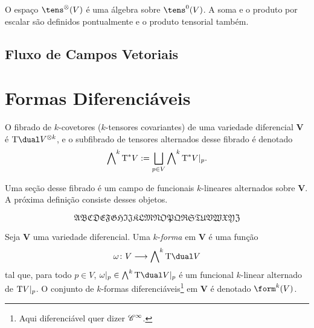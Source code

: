 O espaço $\tens^\otimes (V)$ é uma álgebra sobre $\tens^0(V)$. A soma e o produto por escalar são definidos pontualmente e o produto tensorial também.



   







\subsection{Fluxo de Campos Vetoriais}















\section{Formas Diferenciáveis}

O fibrado de $k$-covetores ($k$-tensores covariantes) de uma variedade diferencial $\bm V$ é $\Tg\dual V^{\otimes k}$, e o subfibrado de tensores alternados desse fibrado é denotado
	\begin{equation*}
	\bigwedge\nolimits^k \mathrm{T}^* V := \bigsqcup_{p \in V} \bigwedge\nolimits^k \mathrm{T}^* V|_p.
	\end{equation*}

Uma seção desse fibrado é um campo de funcionais $k$-lineares alternados sobre $\bm V$. A próxima definição consiste desses objetos.

	\begin{equation*}
	\mathfrak{ABCDEFGHIJKLMNOPQRSTUVWXYZ}
	\end{equation*}

\begin{defi}
Seja $\bm V$ uma variedade diferencial. Uma $k$-\emph{forma} em $\bm V$ é uma função
	\begin{equation*}
	\omega\colon V \to \bigwedge\nolimits^k \Tg\dual V
	\end{equation*}
tal que, para todo $p \in V$, $\omega|_p \in \bigwedge^k\Tg\dual V|_p$ é um funcional $k$-linear alternado de $\mathrm{T} V|_p$. O conjunto de $k$-formas diferenciáveis\footnote{Aqui diferenciável quer dizer $\mathscr{C}^\infty$.} em $\bm V$ é denotado $\form^k (V)$.
\end{defi}

